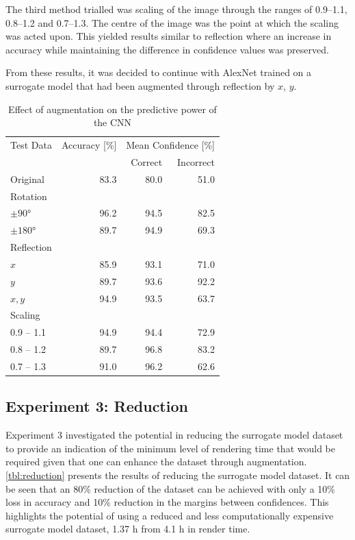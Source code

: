 \documentclass[a4paper, 11pt]{article}
\begin{document}
The third method trialled was scaling of the image through the ranges of 0.9–1.1, 0.8–1.2 and 0.7–1.3. The centre of the image was the point at which the scaling was acted upon. This yielded results similar to reflection where an increase in accuracy while maintaining the difference in confidence values was preserved.

From these results, it was decided to continue with AlexNet trained on a surrogate model that had been augmented through reflection by $x$, $y$.

\begin{table}[t!]
  \centering
  \caption{Effect of augmentation on the predictive power of the CNN}\label{tbl:aug}\small
  \begin{tabular}{l r r r}
    \toprule
      Test Data & Accuracy [\%] & \multicolumn{2}{c}{Mean Confidence [\%]} \\
      & & Correct & Incorrect \\
    \midrule
      Original & 83.3 & 80.0 & 51.0 \\
    \midrule
      \multicolumn{4}{l}{Rotation} \\
    \midrule
      $\pm\ang{90}$ & 96.2 & 94.5 & 82.5 \\
      $\pm\ang{180}$ & 89.7 & 94.9 & 69.3 \\
    \midrule
      \multicolumn{4}{l}{Reflection} \\
    \midrule
      $x$ & 85.9 & 93.1 & 71.0 \\
      $y$ & 89.7 & 93.6 & 92.2 \\
      $x,y$ & 94.9 & 93.5 & 63.7 \\
    \midrule
      \multicolumn{4}{l}{Scaling} \\
    \midrule
      0.9 -- 1.1 & 94.9 & 94.4 & 72.9 \\
      0.8 -- 1.2 & 89.7 & 96.8 & 83.2 \\
      0.7 -- 1.3 & 91.0 & 96.2 & 62.6 \\
    \bottomrule
  \end{tabular}
\end{table}

\subsection{Experiment 3: Reduction}

Experiment 3 investigated the potential in reducing the surrogate model dataset to provide an indication of the minimum level of rendering time that would be required given that one can enhance the dataset through augmentation. \cref{tbl:reduction} presents the results of reducing the surrogate model dataset. It can be seen that an 80\% reduction of the dataset can be achieved with only a 10\% loss in accuracy and 10\% reduction in the margins between confidences. This highlights the potential of using a reduced and less computationally expensive surrogate model dataset, 1.37 h from 4.1 h in render time.
\end{document}

